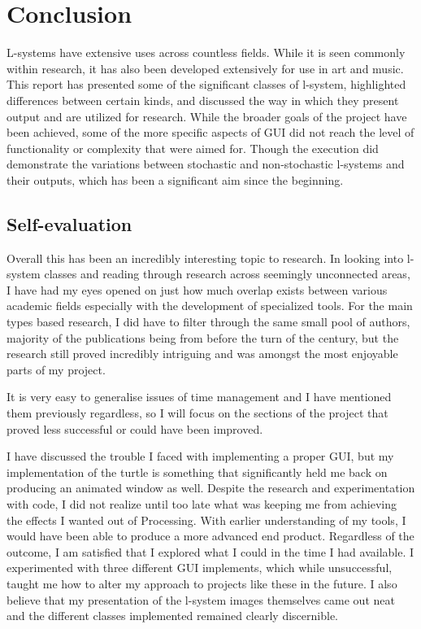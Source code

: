 \documentclass[]{final_report}
\begin{document}
\chapter{Conclusion}

L-systems have extensive uses across countless fields. While it is seen commonly within research, it has also been developed extensively for use in art and music. This report has presented some of the significant classes of l-system, highlighted differences between certain kinds, and discussed the way in which they present output and are utilized for research. While the broader goals of the project have been achieved, some of the more specific aspects of GUI did not reach the level of functionality or complexity that were aimed for. Though the execution did demonstrate the variations between stochastic and non-stochastic l-systems and their outputs, which has been a significant aim since the beginning.

\section{Self-evaluation}

Overall this has been an incredibly interesting topic to research. In looking into l-system classes and reading through research across seemingly unconnected areas, I have had my eyes opened on just how much overlap exists between various academic fields especially with the development of specialized tools. For the main types based research, I did have to filter through the same small pool of authors, majority of the publications being from before the turn of the century, but the research still proved incredibly intriguing and was amongst the most enjoyable parts of my project.

It is very easy to generalise issues of time management and I have mentioned them previously regardless, so I will focus on the sections of the project that proved less successful or could have been improved.

I have discussed the trouble I faced with implementing a proper GUI, but my implementation of the turtle is something that significantly held me back on producing an animated window as well. Despite the research and experimentation with code, I did not realize until too late what was keeping me from achieving the effects I wanted out of Processing. With earlier understanding of my tools, I would have been able to produce a more advanced end product. Regardless of the outcome, I am satisfied that I explored what I could in the time I had available. I experimented with three different GUI implements, which while unsuccessful, taught me how to alter my approach to projects like these in the future. I also believe that my presentation of the l-system images themselves came out neat and the different classes implemented remained clearly discernible.
\end{document}
